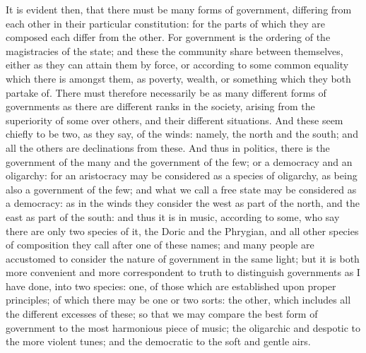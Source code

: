 It is evident then, that there must be many forms of government, differing
from each other in their particular constitution: for the parts of which
they are composed each differ from the other. For government is the
ordering of the magistracies of the state; and these the community share
between themselves, either as they can attain them by force, or according
to some common equality which there is amongst them, as poverty, wealth,
or something which they both partake of. There must therefore necessarily
be as many different forms of governments as there are different ranks in
the society, arising from the superiority of some over others, and their
different situations. And these seem chiefly to be two, as they say, of
the winds: namely, the north and the south; and all the others are
declinations from these. And thus in politics, there is the government of
the many and the government of the few; or a democracy and an oligarchy:
for an aristocracy may be considered as a species of oligarchy, as being
also a government of the few; and what we call a free state may be
considered as a democracy: as in the winds they consider the west as part
of the north, and the east as part of the south: and thus it is in music,
according to some, who say there are only two species of it, the Doric and
the Phrygian, and all other species of composition they call after one of
these names; and many people are accustomed to consider the nature of
government in the same light; but it is both more convenient and more
correspondent to truth to distinguish governments as I have done, into two
species: one, of those which are established upon proper principles; of
which there may be one or two sorts: the other, which includes all the
different excesses of these; so that we may compare the best form of
government to the most harmonious piece of music; the oligarchic and
despotic to the more violent tunes; and the democratic to the soft and
gentle airs.


